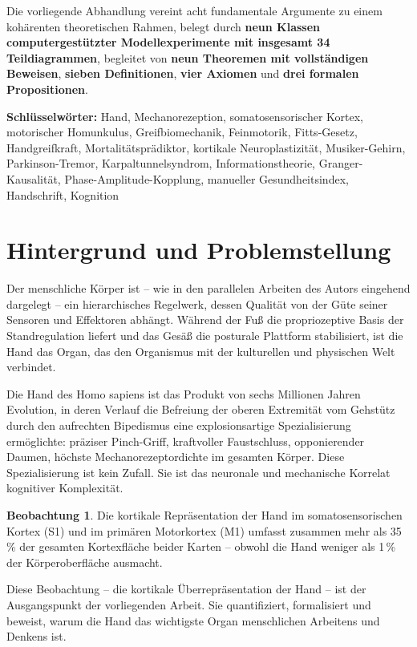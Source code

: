 ﻿\documentclass[12pt,a4paper]{report}
\theoremstyle{plain}
\theoremstyle{definition}
\newtheorem{beobachtung}[theorem]{Beobachtung}
\theoremstyle{remark}
\begin{document}
Die vorliegende Abhandlung vereint acht fundamentale Argumente zu einem
kohärenten theoretischen Rahmen, belegt durch \textbf{neun Klassen
computergestützter Modellexperimente mit insgesamt 34 Teildiagrammen},
begleitet von \textbf{neun Theoremen mit vollständigen Beweisen},
\textbf{sieben Definitionen}, \textbf{vier Axiomen} und
\textbf{drei formalen Propositionen}.

\textbf{Schlüsselwörter:}
Hand, Mechanorezeption, somatosensorischer Kortex, motorischer Homunkulus,
Greifbiomechanik, Feinmotorik, Fitts-Gesetz, Handgreifkraft, Mortalitätsprädiktor,
kortikale Neuroplastizität, Musiker-Gehirn, Parkinson-Tremor,
Karpaltunnelsyndrom, Informationstheorie, Granger-Kausalität,
Phase-Amplitude-Kopplung, manueller Gesundheitsindex, Handschrift, Kognition

\section{Hintergrund und Problemstellung}

Der menschliche Körper ist -- wie in den parallelen Arbeiten des Autors
eingehend dargelegt -- ein hierarchisches Regelwerk, dessen Qualität
von der Güte seiner Sensoren und Effektoren abhängt. Während der Fuß
\cite{epp2026feed} die propriozeptive Basis der Standregulation liefert
und das Gesäß \cite{epp2026butt} die posturale Plattform stabilisiert,
ist die Hand das Organ, das den Organismus mit der kulturellen und
physischen Welt verbindet.

Die Hand des Homo sapiens ist das Produkt von sechs Millionen Jahren
Evolution, in deren Verlauf die Befreiung der oberen Extremität vom
Gehstütz durch den aufrechten Bipedismus eine explosionsartige
Spezialisierung ermöglichte: präziser Pinch-Griff, kraftvoller
Faustschluss, opponierender Daumen, höchste Mechanorezeptordichte im
gesamten Körper. Diese Spezialisierung ist kein Zufall. Sie ist das
neuronale und mechanische Korrelat kognitiver Komplexität.

\begin{beobachtung}
Die kortikale Repräsentation der Hand im somatosensorischen Kortex (S1)
und im primären Motorkortex (M1) umfasst zusammen mehr als 35\,\% der
gesamten Kortexfläche beider Karten -- obwohl die Hand weniger als 1\,\%
der Körperoberfläche ausmacht.
\end{beobachtung}

Diese Beobachtung -- die kortikale Überrepräsentation der Hand -- ist der
Ausgangspunkt der vorliegenden Arbeit. Sie quantifiziert, formalisiert und
beweist, warum die Hand das wichtigste Organ menschlichen Arbeitens und
Denkens ist.
\end{document}
